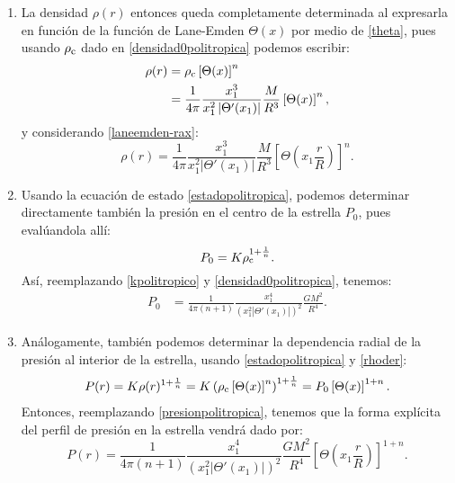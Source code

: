 \begin{enumerate}
\item La densidad $\rho(r)$ entonces queda completamente determinada al expresarla en función de la función de Lane-Emden $\Theta(x)$ por medio de \eqref{theta}, pues usando $\rho_{\rm c}$ dado en \eqref{densidad0politropica} podemos escribir:
\begin{align}
 \rho(r)&=\rho_{\rm c}\left[\Theta(x)\right]^n\label{rhoder}\\
&=\frac{1}{4\pi}\frac{x_1^3}{x_1^2\left|\Theta'(x_1)\right|}\frac{M}{R^3}\left[\Theta(x)\right]^n,
\end{align}
y considerando \eqref{laneemden-rax}:
\begin{equation}\label{densidadpolitropica}
 \rho(r)=\frac{1}{4\pi}\frac{x_1^3}{x_1^2\left|\Theta'(x_1)\right|}\frac{M}{R^3}\left[\Theta\left(x_1\frac{r}{R}\right)\right]^n.
\end{equation}

\item Usando la ecuación de estado \eqref{estadopolitropica}, podemos determinar directamente también la presión en el centro de la estrella $P_0$, pues evalúandola allí:
\begin{equation}
 P_0=K\rho_{\rm c}^{1+\frac{1}{n}}.
\end{equation}
Así, reemplazando \eqref{kpolitropico} y \eqref{densidad0politropica}, tenemos:
\begin{align}
P_0&=\frac{1}{4\pi(n+1)}\frac{x_1^4}{\left(x_1^2\left|\Theta'(x_1)\right|\right)^2}\frac{GM^2}{R^4}\label{presionpolitropica}.
\end{align}
\item Análogamente, también podemos determinar la dependencia radial de la presión al interior de la estrella, usando \eqref{estadopolitropica} y \eqref{rhoder}:
\begin{align}
 P(r)=K\rho(r)^{1+\frac{1}{n}}=K\left(\rho_{\rm c}\left[\Theta(x)\right]^n\right)^{1+\frac{1}{n}}=P_0\left[\Theta(x)\right]^{1+n}.
\end{align}
Entonces, reemplazando \eqref{presionpolitropica}, tenemos que la forma explícita del perfil de presión en la estrella vendrá dado por:
\begin{equation}
 P(r)=\frac{1}{4\pi(n+1)}\frac{x_1^4}{\left(x_1^2\left|\Theta'(x_1)\right|\right)^2}\frac{GM^2}{R^4}\left[\Theta\left( x_1\frac{r}{R}\right)\right]^{1+n}.
\end{equation}






\end{enumerate}


